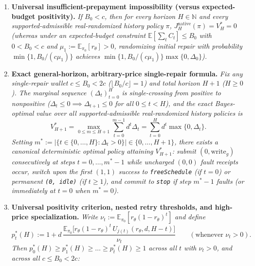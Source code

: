 \documentclass[11pt,a4paper]{article}
\providecommand{\tightlist}{\setlength{\itemsep}{2pt}\setlength{\parskip}{0pt}}
\begin{document}
\begin{enumerate}
\def\labelenumi{\arabic{enumi}.}
\tightlist
\item
  \textbf{Universal insufficient-prepayment impossibility (versus
  expected-budget positivity).} \emph{If \(B_0 < c\), then for every
  horizon \(H \in \mathbb{N}\) and every supported-admissible
  real-randomized history policy \(\pi\),
  \(J_H^{\mathrm{native}}(\pi) = V_H^* = 0\) (whereas under an
  expected-budget constraint \(\mathbb{E}[\sum_t C_t] \le B_0\) with
  \(0 < B_0 < c\) and \(\mu_1 := \mathbb{E}_{\pi_0}[r_\theta] > 0\),
  randomizing initial repair with probability
  \(\min\{1, B_0/(c\mu_1)\}\) achieves
  \(\min\{1, B_0/(c\mu_1)\}\max\{0, \Delta_0\}\)).}
\item
  \textbf{Exact general-horizon, arbitrary-price single-repair formula.}
  \emph{Fix any single-repair wallet \(c \le B_0 < 2c\)
  (\(\lfloor B_0/c\rfloor = 1\)) and total horizon \(H + 1\)
  (\(H \ge 0\)). The marginal sequence \((\Delta_t)_{t=0}^H\) is
  single-crossing from positive to nonpositive
  (\(\Delta_t \le 0 \implies \Delta_{t+1} \le 0\) for all
  \(0 \le t < H\)), and the exact Bayes-optimal value over all
  supported-admissible real-randomized history policies is}
  \[V_{H+1}^* = \max_{0 \le m \le H+1} \sum_{t=0}^{m-1} d^t \Delta_t = \sum_{t=0}^{H} d^t \max\{0, \Delta_t\}.\]
  \emph{Setting
  \(m^* := |\{t \in \{0, \dots, H\} : \Delta_t > 0\}| \in \{0, \dots, H+1\}\),
  there exists a canonical deterministic optimal policy attaining
  \(V_{H+1}^*\): submit \((0, \mathrm{write}_g)\) consecutively at steps
  \(t = 0, \dots, m^* - 1\) while uncharged \((0,0)\) fault receipts
  occur, switch upon the first \((1,1)\) success to
  \texttt{freeSchedule} (if \(t = 0\)) or permanent \texttt{(0,\ idle)}
  (if \(t \ge 1\)), and commit to \texttt{stop} if step \(m^* - 1\)
  faults (or immediately at \(t = 0\) when \(m^* = 0\)).}
\item
  \textbf{Universal positivity criterion, nested retry thresholds, and
  high-price specialization.} \emph{Write
  \(\nu_t := \mathbb{E}_{\pi_0}[r_\theta(1 - r_\theta)^t]\) and define}
  \[p_t^*(H) := 1 + d\,\frac{\mathbb{E}_{\pi_0}\!\bigl[r_\theta (1 - r_\theta)^t\, U_{j(t)}(r_\theta, d, H - t)\bigr]}{\nu_t} \qquad (\text{whenever } \nu_t > 0).\]
  \emph{Then
  \(p_0^*(H) \ge p_1^*(H) \ge \dots \ge p_{\bar{t}}^*(H) \ge 1\) across
  all \(t\) with \(\nu_t > 0\), and across all \(c \le B_0 < 2c\):}


\end{enumerate}
\end{document}
